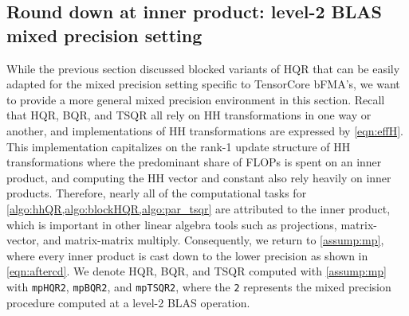 \documentclass[review,onefignum,onetabnum]{siamart190516}
\newcommand{\bb}[1]{\mathbf{#1}}
\begin{document}

%
\subsection{Round down at inner product: level-2 BLAS mixed precision setting}\label{sec:mp-2}
While the previous section discussed blocked variants of HQR that can be easily adapted for the mixed precision setting specific to TensorCore bFMA's, we want to provide a more general mixed precision environment in this section.
Recall that HQR, BQR, and TSQR all rely on HH transformations in one way or another, and implementations of HH transformations are expressed by \cref{eqn:effH}.
This implementation capitalizes on the rank-1 update structure of HH transformations where the predominant share of FLOPs is spent on an inner product, and computing the HH vector and constant also rely heavily on inner products.
Therefore, nearly all of the computational tasks for \cref{algo:hhQR,algo:blockHQR,algo:par_tsqr} are attributed to the inner product, which is important in other linear algebra tools such as projections, matrix-vector, and matrix-matrix multiply.
Consequently, we return to \cref{assump:mp}, where every inner product is cast down to the lower precision as shown in \cref{eqn:aftercd}. 
We denote HQR, BQR, and TSQR computed with \cref{assump:mp} with {\tt mpHQR2}, {\tt mpBQR2}, and {\tt mpTSQR2}, where the {\tt 2} represents the mixed precision procedure computed at a level-2 BLAS operation.
\end{document}
